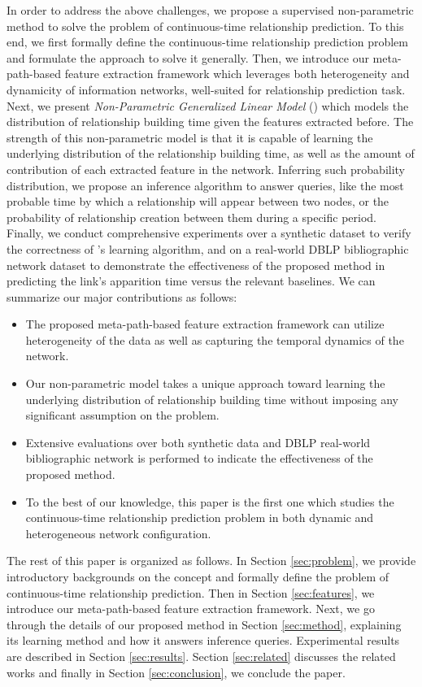 In order to address the above challenges, we propose a supervised non-parametric method to solve the problem of continuous-time relationship prediction. To this end, we first formally define the continuous-time relationship prediction problem and formulate the approach to solve it generally. Then, we introduce our meta-path-based feature extraction framework which leverages both heterogeneity and dynamicity of information networks, well-suited for relationship prediction task. Next, we present \emph{Non-Parametric Generalized Linear Model} (\npglm) which models the distribution of relationship building time given the features extracted before. The strength of this non-parametric model is that it is capable of learning the underlying distribution of the relationship building time, as well as the amount of contribution of each extracted feature in the network. Inferring such probability distribution, we propose an inference algorithm to answer queries, like the most probable time by which a relationship will appear between two nodes, or the probability of relationship creation between them during a specific period. Finally, we conduct comprehensive experiments over a synthetic dataset to verify the correctness of \npglm's learning algorithm, and on a real-world DBLP bibliographic network dataset to demonstrate the effectiveness of the proposed method in predicting the link's apparition time versus the relevant baselines. We can summarize our major contributions as follows:

\begin{itemize}
\item The proposed meta-path-based feature extraction framework can utilize heterogeneity of the data as well as capturing the temporal dynamics of the network.
\item Our non-parametric model takes a unique approach toward learning the underlying distribution of relationship building time without imposing any significant assumption on the problem.
\item Extensive evaluations over both synthetic data and DBLP real-world bibliographic network is performed to indicate the effectiveness of the proposed method. 
\item To the best of our knowledge, this paper is the first one which studies the continuous-time relationship prediction problem in both dynamic and heterogeneous network configuration.
\end{itemize}

The rest of this paper is organized as follows. In Section \ref{sec:problem}, we provide introductory backgrounds on the concept and formally define the problem of continuous-time relationship prediction. Then in Section \ref{sec:features}, we introduce our meta-path-based feature extraction framework. Next, we go through the details of our proposed \npglm method in Section \ref{sec:method}, explaining its learning method and how it answers inference queries. Experimental results are described in Section \ref{sec:results}. Section \ref{sec:related} discusses the related works and finally in Section \ref{sec:conclusion}, we conclude the paper.
